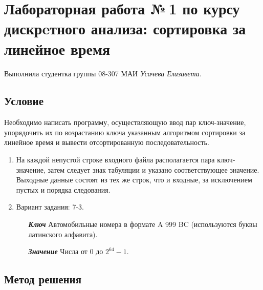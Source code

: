 \documentclass[12pt]{article}
\begin{document}
\section*{Лабораторная работа №\,1 по курсу дискрeтного анализа: сортировка за линейное время}

Выполнила студентка группы 08-307 МАИ \textit{Усачева Елизавета}.

\subsection*{Условие}

Необходимо написать программу, осуществляющую  ввод пар ключ-значение, упорядочить их по возрастанию ключа указанным алгоритмом сортировки за линейное время и вывести отсортированную последовательность.
\begin{enumerate}
\item На каждой непустой строке входного файла располагается пара ключ-значение, затем следует знак табуляции и указано соответствующее значение. Выходные данные состоят из тех же строк, что и входные, за исключением пустых и порядка следования.
\item Вариант задания: 7-3.
\begin{itemize}
 \item[\textbf{ \it Ключ}] Автомобильные номера в формате A 999 BC (используются буквы латинского алфавита).
 \item[\textbf{ \it Значение}] Числа от 0 до $2^{64} - 1$.
\end{itemize}
\end{enumerate}

\subsection*{Метод решения}
\end{document}
